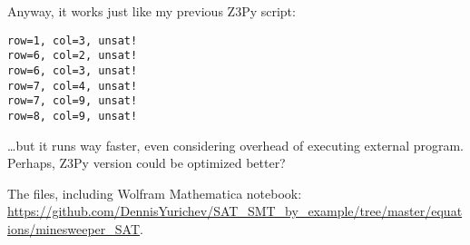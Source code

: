 Anyway, it works just like my previous Z3Py script:

\begin{lstlisting}
row=1, col=3, unsat!
row=6, col=2, unsat!
row=6, col=3, unsat!
row=7, col=4, unsat!
row=7, col=9, unsat!
row=8, col=9, unsat!
\end{lstlisting}

\dots but it runs way faster, even considering overhead of executing external program.
Perhaps, Z3Py version could be optimized better?

The files, including Wolfram Mathematica notebook: 
\url{https://github.com/DennisYurichev/SAT_SMT_by_example/tree/master/equations/minesweeper_SAT}.

